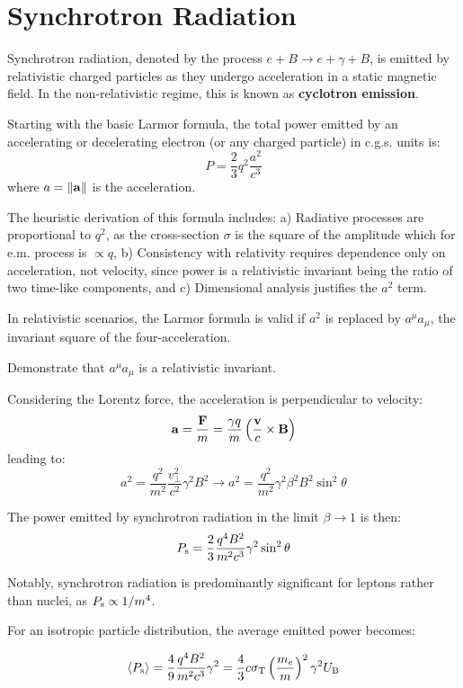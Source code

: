 \section{Synchrotron Radiation}

Synchrotron radiation, denoted by the process \( e + B \rightarrow e + \gamma + B \), is emitted by relativistic charged particles as they undergo acceleration in a static magnetic field. In the non-relativistic regime, this is known as 
\textbf{cyclotron emission}.

Starting with the basic Larmor formula, the total power emitted by an accelerating or decelerating electron (or any charged particle) in c.g.s. units is:
%
\[
P = \frac{2}{3} q^2 \frac{a^2}{c^3}
\]
%
where \( a = \| \vb a \|\) is the acceleration.

The heuristic derivation of this formula includes: a) Radiative processes are proportional to \( q^2 \), as the cross-section \( \sigma \) is the square of the amplitude which for e.m. process is \( \propto q \), b) Consistency with relativity requires dependence only on acceleration, not velocity, since power is a relativistic invariant being the ratio of two time-like components, and c) Dimensional analysis justifies the \( a^2 \) term.

In relativistic scenarios, the Larmor formula is valid if \( a^2 \) is replaced by \( a^\mu a_\mu \), the invariant square of the four-acceleration. 

\begin{problem}
Demonstrate that \( a^\mu a_\mu \)  is a relativistic invariant.
\end{problem}

Considering the Lorentz force, the acceleration is perpendicular to velocity:
%
\[
\vb a = \frac{\vb F}{m} = \frac{\gamma q}{m} \left(\frac{\vb v}{c} \times \vb B \right)
\]
%
leading to:
%
\[
a^2 = \frac{q^2}{m^2} \frac{v_\perp^2}{c^2} \gamma^2 B^2 \longrightarrow a^2 = \frac{q^2}{m^2} \gamma^2 \beta^2 B^2 \sin^2 \theta
\]

The power emitted by synchrotron radiation in the limit \( \beta \rightarrow 1 \) is then:
%
\[
P_{\rm s} = \frac{2}{3} \frac{q^4 B^2}{m^2 c^3} \gamma^2 \sin^2 \theta
\]

Notably, synchrotron radiation is predominantly significant for leptons rather than nuclei, as \( P_{\rm s} \propto 1/m^4 \).

For an isotropic particle distribution, the average emitted power becomes:
%
\begin{remark}
\[
\langle P_{\rm s} \rangle = \frac{4}{9} \frac{q^4 B^2}{m^2 c^3} \gamma^2 = \frac{4}{3} c \sigma_{\rm T} \left(\frac{m_e}{m}\right)^2 \gamma^2 U_{\rm B}
\]
\end{remark}

